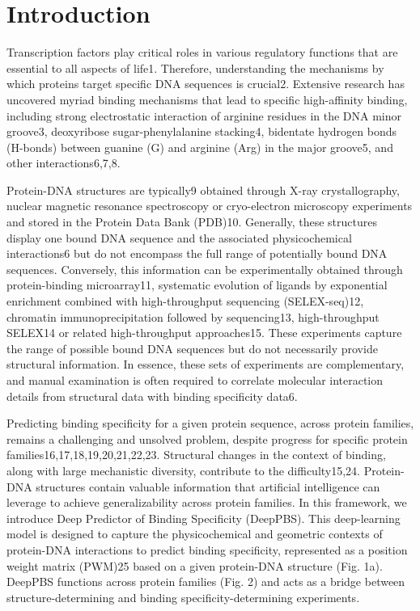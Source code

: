 \section{Introduction} 

Transcription factors play critical roles in various regulatory functions that are essential to all aspects of life1. Therefore, understanding the mechanisms by which proteins target specific DNA sequences is crucial2. Extensive research has uncovered myriad binding mechanisms that lead to specific high-affinity binding, including strong electrostatic interaction of arginine residues in the DNA minor groove3, deoxyribose sugar-phenylalanine stacking4, bidentate hydrogen bonds (H-bonds) between guanine (G) and arginine (Arg) in the major groove5, and other interactions6,7,8.
\par
Protein-DNA structures are typically9 obtained through X-ray crystallography, nuclear magnetic resonance spectroscopy or cryo-electron microscopy experiments and stored in the Protein Data Bank (PDB)10. Generally, these structures display one bound DNA sequence and the associated physicochemical interactions6 but do not encompass the full range of potentially bound DNA sequences. Conversely, this information can be experimentally obtained through protein-binding microarray11, systematic evolution of ligands by exponential enrichment combined with high-throughput sequencing (SELEX-seq)12, chromatin immunoprecipitation followed by sequencing13, high-throughput SELEX14 or related high-throughput approaches15. These experiments capture the range of possible bound DNA sequences but do not necessarily provide structural information. In essence, these sets of experiments are complementary, and manual examination is often required to correlate molecular interaction details from structural data with binding specificity data6.
\par
Predicting binding specificity for a given protein sequence, across protein families, remains a challenging and unsolved problem, despite progress for specific protein families16,17,18,19,20,21,22,23. Structural changes in the context of binding, along with large mechanistic diversity, contribute to the difficulty15,24. Protein-DNA structures contain valuable information that artificial intelligence can leverage to achieve generalizability across protein families. In this framework, we introduce Deep Predictor of Binding Specificity (DeepPBS). This deep-learning model is designed to capture the physicochemical and geometric contexts of protein-DNA interactions to predict binding specificity, represented as a position weight matrix (PWM)25 based on a given protein-DNA structure (Fig. 1a). DeepPBS functions across protein families (Fig. 2) and acts as a bridge between structure-determining and binding specificity-determining experiments.
